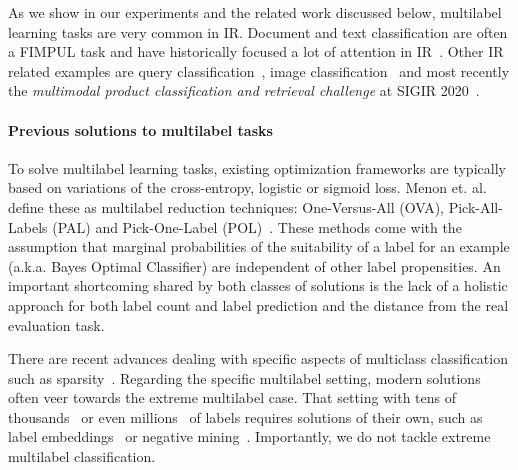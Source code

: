 
As we show in our experiments and the related work discussed below, multilabel learning tasks are very common in \ac{IR}. Document and text classification are often a FIMPUL task and have historically focused a lot of attention in \ac{IR}~\cite{IRClassStat, textCategorization, statTextCategorization, documentClassification}. Other \ac{IR} related examples are query classification~\cite{queryClassification, introIR}, image classification~\cite{imageClassification, faceDetection} and most recently the \textit{multimodal product classification and retrieval challenge} at SIGIR 2020~\cite{Amoualian2020SIGIR2E}. 

\paragraph{Previous solutions to multilabel tasks}
To solve multilabel learning tasks, existing optimization frameworks are typically based on variations of the cross-entropy, logistic or sigmoid loss. Menon et. al. define these as multilabel reduction techniques: One-Versus-All (OVA), Pick-All-Labels (PAL) and Pick-One-Label (POL)~\cite{multilabelReduction}. These methods come with the assumption that marginal probabilities of the suitability of a label for an example (a.k.a. Bayes Optimal Classifier) are independent of other label propensities. An important shortcoming shared by both classes of solutions is the lack of a holistic approach for both label count and label prediction and the distance from the real evaluation task.

There are recent advances dealing with specific aspects of multiclass classification such as sparsity~\citep[see, e.g.,][]{focalLoss,tencent}. Regarding the specific multilabel setting, modern solutions often veer towards the extreme multilabel case. That setting with tens of thousands~\cite{extremeClassification} or even millions~\cite{millionsOfLabels, extremeMilliionsSlice} of labels requires solutions of their own, such as label embeddings~\cite{extremeMultilabelEmbeddings} or negative mining~\cite{stochasticNegativeMining}. Importantly, we do not tackle extreme multilabel classification. 

